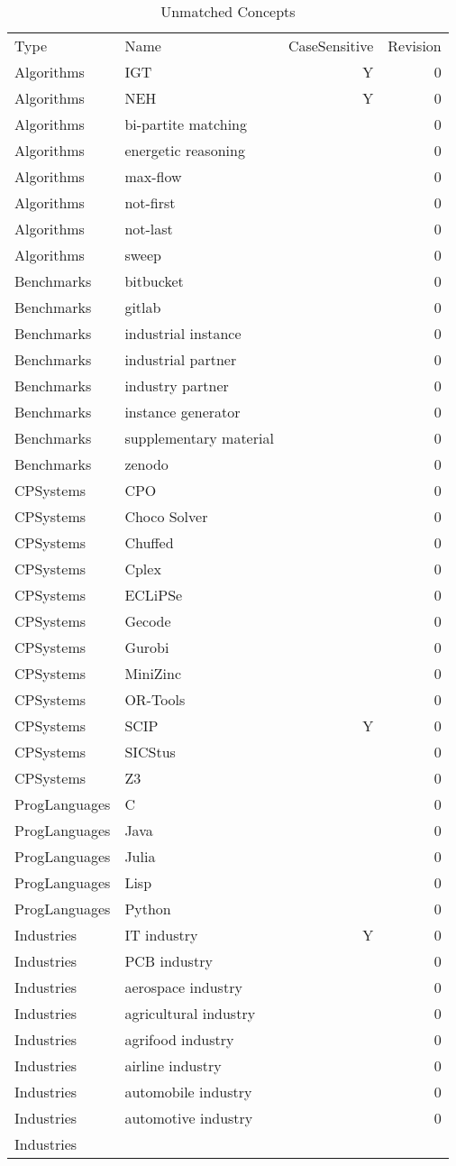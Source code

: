 {\scriptsize
\begin{longtable}{lp{10cm}rr}
\rowcolor{white}\caption{Unmatched Concepts}\\ \toprule
\rowcolor{white}Type & Name & CaseSensitive & Revision\\ \midrule
\endhead
\bottomrule
\endfoot
Algorithms & IGT & Y & 0\\Algorithms & NEH & Y & 0\\Algorithms & bi-partite matching &  & 0\\Algorithms & energetic reasoning &  & 0\\Algorithms & max-flow &  & 0\\Algorithms & not-first &  & 0\\Algorithms & not-last &  & 0\\Algorithms & sweep &  & 0\\Benchmarks & bitbucket &  & 0\\Benchmarks & gitlab &  & 0\\Benchmarks & industrial instance &  & 0\\Benchmarks & industrial partner &  & 0\\Benchmarks & industry partner &  & 0\\Benchmarks & instance generator &  & 0\\Benchmarks & supplementary material &  & 0\\Benchmarks & zenodo &  & 0\\CPSystems & CPO &  & 0\\CPSystems & Choco Solver &  & 0\\CPSystems & Chuffed &  & 0\\CPSystems & Cplex &  & 0\\CPSystems & ECLiPSe &  & 0\\CPSystems & Gecode &  & 0\\CPSystems & Gurobi &  & 0\\CPSystems & MiniZinc &  & 0\\CPSystems & OR-Tools &  & 0\\CPSystems & SCIP & Y & 0\\CPSystems & SICStus &  & 0\\CPSystems & Z3 &  & 0\\ProgLanguages & C  &  & 0\\ProgLanguages & Java &  & 0\\ProgLanguages & Julia &  & 0\\ProgLanguages & Lisp &  & 0\\ProgLanguages & Python &  & 0\\Industries & IT industry & Y & 0\\Industries & PCB industry &  & 0\\Industries & aerospace industry &  & 0\\Industries & agricultural industry &  & 0\\Industries & agrifood industry &  & 0\\Industries & airline industry &  & 0\\Industries & automobile industry &  & 0\\Industries & automotive industry &  & 0\\Industries & 
\end{longtable}}
